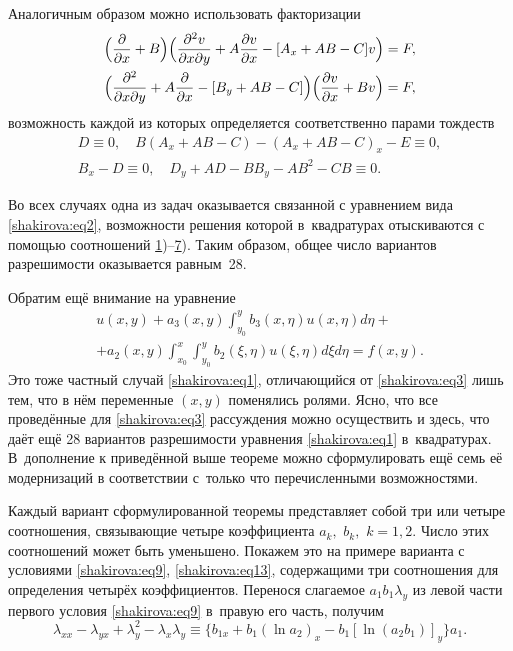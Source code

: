 Аналогичным образом можно использовать факторизации
\begin{gather}
\Bigl(\frac{\partial}{\partial x}+B\Bigr)\Bigl(\frac{\partial^2 v}{\partial x\partial y}+A\frac{\partial v}{\partial x}-[A_x+AB-C]v\Bigr)=F,
\\
\Bigl(\frac{\partial^2}{\partial x \partial y}+A\frac{\partial}{\partial x}-[B_y+AB-C]\Bigr)\Bigl(\frac{\partial v}{\partial x}+Bv\Bigr)=F,
\end{gather}
возможность каждой из которых определяется соответственно парами тождеств
\begin{gather}
D\equiv 0, \quad B(A_x+AB-C)-(A_x+AB-C)_x-E\equiv 0,
\\
B_x-D\equiv 0, \quad D_y+AD-BB_y-AB^2-CB\equiv 0.
\end{gather}

Во всех случаях одна из задач оказывается связанной с уравнением вида \eqref{shakirova:eq2}, возможности решения которой в~квадратурах отыскиваются с помощью соотношений \hyperlink{shakirova:t1}{1})--\hyperlink{shakirova:t7}{7}). 
Таким образом, общее число вариантов разрешимости оказывается равным~28.

Обратим ещё внимание на уравнение 
\begin{multline}
\label{shakirova:eq21}
u(x,y)+a_3(x,y)\int_{y_0}^yb_3(x,\eta)u(x,\eta)d\eta+ \\ 
+a_2(x,y)\int_{x_0}^x\int_{y_0}^yb_2(\xi,\eta)u(\xi,\eta)d\xi d\eta=f(x,y).
\end{multline}
Это тоже частный случай \eqref{shakirova:eq1}, отличающийся от \eqref{shakirova:eq3} лишь тем, что в нём переменные $(x, y)$ поменялись ролями. 
Ясно, что все проведённые для \eqref{shakirova:eq3} рассуждения можно осуществить и здесь, что даёт ещё 28 вариантов разрешимости уравнения \eqref{shakirova:eq1} в~квадратурах. 
В~дополнение к приведённой выше теореме можно сформулировать ещё семь её модернизаций в соответствии с~только что перечисленными возможностями.

Каждый вариант сформулированной теоремы представляет собой три или четыре соотношения, связывающие четыре коэффициента $a_k,$ $b_k,$ $k=1, 2$. 
Число этих соотношений может быть уменьшено.
Покажем это на примере варианта с условиями \eqref{shakirova:eq9}, \eqref{shakirova:eq13}, содержащими три соотношения для определения четырёх коэффициентов. 
Перенося слагаемое $a_1b_1\lambda_y$ из левой части первого условия \eqref{shakirova:eq9} в~правую его часть, получим
\begin{equation}
\label{shakirova:eq22}
\lambda_{xx}-\lambda_{yx}+\lambda^2_y-\lambda_x\lambda_y \equiv \{b_{1x}+b_1(\ln a_2)_x-b_1[\ln (a_2b_1)]_y \}a_1.
\end{equation}


